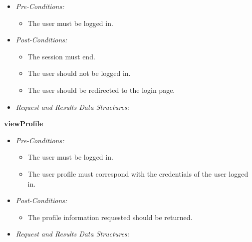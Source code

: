 \documentclass[a4paper,12pt]{article}
\begin{document}
	\begin{itemize}
		\item \textit{Pre-Conditions:}
			\begin{itemize}
				\item The user must be logged in.
			\end{itemize}
		\item \textit{Post-Conditions:}
			\begin{itemize}
				\item The session must end.
				\item The user should not be logged in.
				\item The user should be redirected to the login page.
			\end{itemize}
		\item \textit{Request and Results Data Structures:}
	\end{itemize}
\textbf{\large{viewProfile}}
	\begin{itemize}
		\item \textit{Pre-Conditions:}
			\begin{itemize}
				\item The user must be logged in.
				\item The user profile must correspond with the credentials of the user logged in.
			\end{itemize}
		\item \textit{Post-Conditions:}
			\begin{itemize}
				\item The profile information requested should be returned.
			\end{itemize}
		\item \textit{Request and Results Data Structures:}
	\end{itemize}
\end{document}
